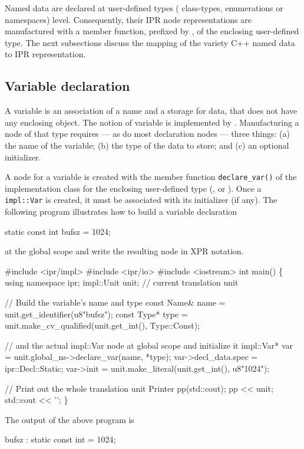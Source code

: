 \documentclass[11pt]{article}
\begin{document}
Named data are declared at user-defined types (\ie{} class-types,
enumerations or namespaces) level.  Consequently, their IPR node
representations are  manufactured with a member function, prefixed by
, of the enclosing user-defined type. The next subsections
discuss the mapping of the variety C++ named data to IPR representation.

\subsection{Variable declaration}
\label{sec:decl.variable}

A variable is an association of a name and a storage for data, that does not
have any enclosing object. The notion of variable is implemented by
.  Manufacturing a node of that type requires ---
as do most declaration nodes --- three things: (a) the name of the variable;
(b) the type of the data to store; and (c) an optional initializer.

A node for a variable is created with the member function
\texttt{declare\_var()} of the implementation class for the enclosing
user-defined type (,  or
).  Once a \texttt{impl::Var} is
created, it must be 
associated with its initializer (if any).  The following program
illustrates how to build a variable declaration 
\begin{Program}
  static const int bufsz = 1024;
\end{Program}
at the global scope and write the resulting node in XPR notation.
\begin{Program}
#include <ipr/impl>
#include <ipr/io>
#include <iostream>
int main()
\{
   using namespace ipr;
   impl::Unit unit;              // current translation unit
   
   // Build the variable's name and type
   const Name& name = unit.get_identifier(u8"bufsz");
   const Type* type = unit.make_cv_qualified(unit.get_int(), Type::Const);

   // and the actual impl::Var node at global scope and initialize it
   impl::Var* var = unit.global_ns->declare_var(name, *type);
   var->decl_data.spec = ipr::Decl::Static;
   var->init = unit.make_literal(unit.get_int(), u8"1024");
   
   // Print out the whole translation unit
   Printer pp(std::cout);
   pp << unit;
   std::cout << '';
\}
\end{Program}
The output of the above program is
\begin{Output}
  bufsz : static const int = 1024;
\end{Output}
\end{document}
